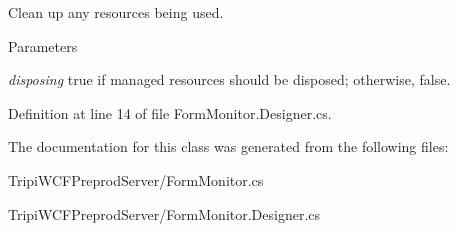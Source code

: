 Clean up any resources being used. 
\begin{DoxyParams}{Parameters}
\item[{\em disposing}]true if managed resources should be disposed; otherwise, false.\end{DoxyParams}


Definition at line 14 of file FormMonitor.Designer.cs.

The documentation for this class was generated from the following files:\begin{DoxyCompactItemize}
\item 
TripiWCFPreprodServer/FormMonitor.cs\item 
TripiWCFPreprodServer/FormMonitor.Designer.cs\end{DoxyCompactItemize}
